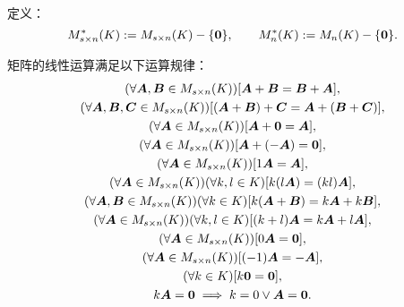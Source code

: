 定义：\begin{equation*}
	M_{s \times n}^*(K) := M_{s \times n}(K)-\{\boldsymbol0\},
	\qquad
	M_n^*(K) := M_n(K)-\{\boldsymbol0\}.
\end{equation*}

\begin{theorem}
矩阵的线性运算满足以下运算规律：
\begin{gather}
	(\forall\boldsymbol{A},\boldsymbol{B}\in M_{s\times n}(K))[\boldsymbol{A} + \boldsymbol{B} = \boldsymbol{B} + \boldsymbol{A}], \\
	(\forall\boldsymbol{A},\boldsymbol{B},\boldsymbol{C}\in M_{s\times n}(K))[(\boldsymbol{A} + \boldsymbol{B}) + \boldsymbol{C} = \boldsymbol{A} + (\boldsymbol{B} + \boldsymbol{C})], \\
	(\forall\boldsymbol{A}\in M_{s\times n}(K))[\boldsymbol{A} + \boldsymbol0 = \boldsymbol{A}], \\
	(\forall\boldsymbol{A}\in M_{s\times n}(K))[\boldsymbol{A} + (-\boldsymbol{A}) = \boldsymbol0], \\
	(\forall\boldsymbol{A}\in M_{s\times n}(K))[1 \boldsymbol{A} = \boldsymbol{A}], \\
	(\forall\boldsymbol{A}\in M_{s\times n}(K))(\forall k,l\in K)[k(l \boldsymbol{A}) = (kl) \boldsymbol{A}], \\
	(\forall\boldsymbol{A},\boldsymbol{B}\in M_{s\times n}(K))(\forall k\in K)[k(\boldsymbol{A} + \boldsymbol{B}) = k\boldsymbol{A} + k\boldsymbol{B}], \\
	(\forall\boldsymbol{A}\in M_{s\times n}(K))(\forall k,l\in K)[(k+l)\boldsymbol{A} = k\boldsymbol{A} + l\boldsymbol{A}], \\
	(\forall\boldsymbol{A}\in M_{s\times n}(K))[0\boldsymbol{A} = \boldsymbol0], \\
	(\forall\boldsymbol{A}\in M_{s\times n}(K))[(-1)\boldsymbol{A} = -\boldsymbol{A}], \\
	(\forall k\in K)[k\boldsymbol0 = \boldsymbol0], \\
	k\boldsymbol{A} = \boldsymbol0 \implies k = 0 \lor \boldsymbol{A} = \boldsymbol0.
\end{gather}
\end{theorem}
